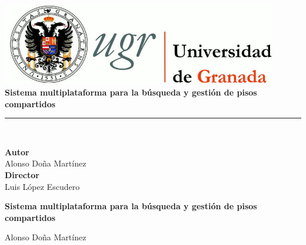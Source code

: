 \chapter*{}

\begin{titlepage}
\newlength{\centeroffset}
\setlength{\centeroffset}{-0.5\oddsidemargin}
\addtolength{\centeroffset}{0.5\evensidemargin}
\thispagestyle{empty}


\noindent\hspace*{\centeroffset}\begin{minipage}{\textwidth}

\centering
\includegraphics[width=0.9\textwidth]{logos/logo_ugr.jpg}\\[1.4cm]

{\Huge\bfseries Sistema multiplataforma para la búsqueda y gestión de pisos compartidos \\}
\noindent\rule[-1ex]{\textwidth}{3pt}\\[3.5ex]

\end{minipage}

\vspace{1cm}
\noindent\hspace*{\centeroffset}
\begin{minipage}{\textwidth}
\centering

\textbf{Autor}\\ {Alonso Doña Martínez}\\[2.5ex]
\textbf{Director}\\ {Luis López Escudero}\\[2cm]

\end{minipage}
\end{titlepage}

\cleardoublepage
\thispagestyle{empty}
\begin{center}
{\large\bfseries Sistema multiplataforma para la búsqueda y gestión de pisos compartidos }\\
\end{center}
\begin{center}
Alonso Doña Martínez\\
\end{center}

